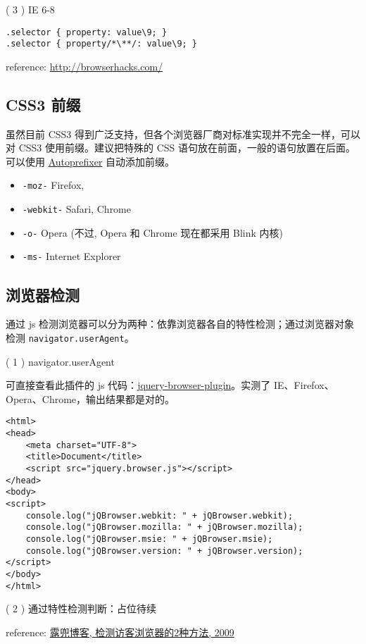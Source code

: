 ( 3 ) IE 6-8

\begin{verbatim}.selector { property: value\9; }
.selector { property/*\**/: value\9; }
\end{verbatim}

reference: \href{http://browserhacks.com/}{http://browserhacks.com/}

\subsection{CSS3 前缀}\hypertarget{css3-}{}\label{css3-}

虽然目前 CSS3 得到广泛支持，但各个浏览器厂商对标准实现并不完全一样，可以对 CSS3 使用前缀。建议把特殊的 CSS 语句放在前面，一般的语句放置在后面。可以使用 \href{https://github.com/search?utf8=\%E2\%9C\%93\&q=Autoprefixer}{Autoprefixer} 自动添加前缀。

\begin{itemize}
\item \texttt{-moz-} Firefox,
\item \texttt{-webkit-} Safari, Chrome
\item \texttt{-o-} Opera (不过, Opera 和 Chrome 现在都采用 Blink 内核)
\item \texttt{-ms-} Internet Explorer
\end{itemize}

\subsection{浏览器检测}\hypertarget{section-1}{}\label{section-1}

通过 js 检测浏览器可以分为两种：依靠浏览器各自的特性检测；通过浏览器对象检测 \texttt{navigator.userAgent}。

( 1 ) navigator.userAgent

可直接查看此插件的 js 代码：\href{https://github.com/gabceb/jquery-browser-plugin}{jquery-browser-plugin}。实测了 IE、Firefox、Opera、Chrome，输出结果都是对的。

\begin{verbatim}<html>
<head>
    <meta charset="UTF-8">
    <title>Document</title>
    <script src="jquery.browser.js"></script>
</head>
<body>
<script>
    console.log("jQBrowser.webkit: " + jQBrowser.webkit);
    console.log("jQBrowser.mozilla: " + jQBrowser.mozilla);
    console.log("jQBrowser.msie: " + jQBrowser.msie);
    console.log("jQBrowser.version: " + jQBrowser.version);
</script>
</body>
</html>
\end{verbatim}

( 2 ) 通过特性检测判断：占位待续

reference: \href{http://www.ludou.org/2-way-to-detect-browser.html}{露兜博客, 检测访客浏览器的2种方法, 2009}

